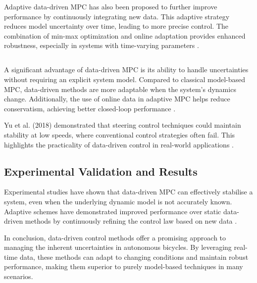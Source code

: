 Adaptive data-driven MPC has also been proposed to further improve performance by continuously integrating new data. This adaptive strategy reduces model uncertainty over time, leading to more precise control. The combination of min-max optimization and online adaptation provides enhanced robustness, especially in systems with time-varying parameters \cite{xie2024}.

\subsection{}
A significant advantage of data-driven MPC is its ability to handle uncertainties without requiring an explicit system model. Compared to classical model-based MPC, data-driven methods are more adaptable when the system's dynamics change. Additionally, the use of online data in adaptive MPC helps reduce conservatism, achieving better closed-loop performance \cite{xie2024}.

Yu et al. (2018) demonstrated that  steering control techniques could maintain stability at low speeds, where conventional control strategies often fail. This highlights the practicality of data-driven control in real-world applications \cite{yu2018}.

\subsection{Experimental Validation and Results}
Experimental studies have shown that data-driven MPC can effectively stabilise a system, even when the underlying dynamic model is not accurately known. Adaptive schemes have demonstrated improved performance over static data-driven methods by continuously refining the control law based on new data \cite{xie2024}.

In conclusion, data-driven control methods offer a promising approach to managing the inherent uncertainties in autonomous bicycles. By leveraging real-time data, these methods can adapt to changing conditions and maintain robust performance, making them superior to purely model-based techniques in many scenarios.


\section{}

